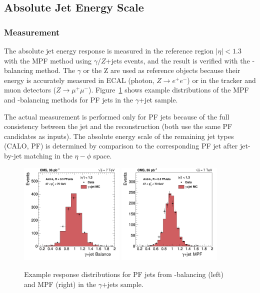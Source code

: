 \subsection{Absolute Jet Energy Scale}
\subsubsection{Measurement}
The absolute jet energy response is measured in the reference region $|\eta|<1.3$ with the MPF method using $\gamma/Z$+jets events,  and the result is verified with the \pt-balancing method. The $\gamma$ or the Z are used as reference objects because their energy is accurately measured in ECAL (photon, $Z\rightarrow e^+e^-$) or in the tracker and muon detectors ($Z\rightarrow \mu^+\mu^-$). Figure~\ref{fig:photonResponse} shows example distributions of the MPF and \pt-balancing methods for PF jets in the $\gamma$+jet sample.

The actual measurement is performed only for PF jets because of the full consistency between the jet and the \vecmet reconstruction (both use the same PF candidates as inputs). The absolute energy scale of the remaining jet types (CALO, PF) is determined by comparison to the corresponding PF jet after jet-by-jet matching in the $\eta-\phi$ space.    

\begin{figure}[ht!]
  \begin{center}
    \includegraphics[width=0.45\textwidth]{Figures/JEC/response_L2L3_eta013_ptPhot_47_70}
    \includegraphics[width=0.45\textwidth]{Figures/JEC/responseMPF_eta013_ptPhot_47_70}
    \caption{Example response distributions for PF jets from \pt-balancing (left) and MPF (right) in the $\gamma$+jets sample.}
    \label{fig:photonResponse}
  \end{center}
\end{figure}

